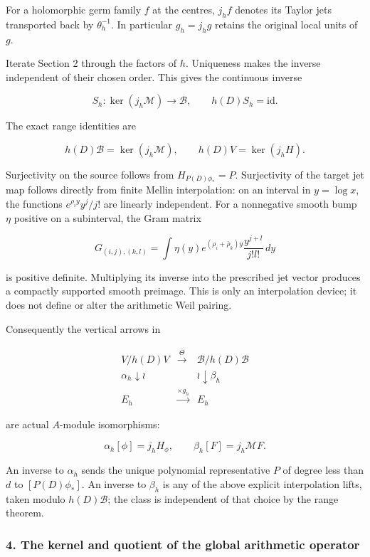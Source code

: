 For a holomorphic germ family \(f\) at the centres, \(j_hf\) denotes its Taylor jets transported
back by \(\theta_h^{-1}\). In particular \(g_h=j_hg\) retains the original local units of \(g\).

Iterate Section 2 through the factors of \(h\). Uniqueness makes the inverse independent of their
chosen order. This gives the continuous inverse

\[S_h:\ker(j_h\mathcal M)\longrightarrow\mathscr B,
\qquad h(D)S_h=\mathrm{id}.\]

The exact range identities are

\[h(D)\mathscr B=\ker(j_h\mathcal M),\qquad
h(D)V=\ker(j_hH).\]

Surjectivity on the source follows from \(H_{P(D)\phi_*}=P\). Surjectivity of the target jet map
follows directly from finite Mellin interpolation: on an interval in \(y=\log x\), the functions
\(e^{\rho_i y}y^j/j!\) are linearly independent. For a nonnegative smooth bump \(\eta\) positive on
a subinterval, the Gram matrix

\[G_{(i,j),(k,l)}=\int\eta(y)e^{(\rho_i+\bar\rho_k)y}\frac{y^{j+l}}{j!l!}\,dy\]

is positive definite. Multiplying its inverse into the prescribed jet vector produces a compactly
supported smooth preimage. This is only an interpolation device; it does not define or alter the
arithmetic Weil pairing.

Consequently the vertical arrows in

\[\boxed{\begin{array}{ccc}
V/h(D)V&\xrightarrow{\overline\Theta}&\mathscr B/h(D)\mathscr B\\
\alpha_h\downarrow\wr&&\wr\downarrow\beta_h\\
E_h&\xrightarrow{\times g_h}&E_h
\end{array}}\]

are actual \(A\)-module isomorphisms:

\[\alpha_h[\phi]=j_hH_\phi,\qquad \beta_h[F]=j_h\mathcal MF.\]

An inverse to \(\alpha_h\) sends the unique polynomial representative \(P\) of degree less than
\(d\) to \([P(D)\phi_*]\). An inverse to \(\beta_h\) is any of the above explicit interpolation
lifts, taken modulo \(h(D)\mathscr B\); the class is independent of that choice by the range
theorem.

\subsubsection{4. The kernel and quotient of the global arithmetic
operator}\label{pr_8:the-kernel-and-quotient-of-the-global-arithmetic-operator}

